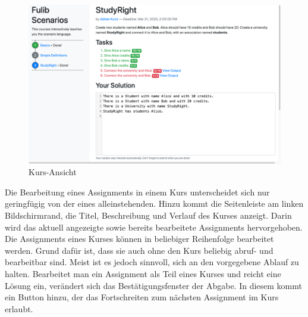 \begin{figure}
    \centering
    \includegraphics[width=\textwidth]{chapter/fulib.org/img/course-view.png}
    \caption{Kurs-Ansicht}
    \label{fig:course-view}
\end{figure}

Die Bearbeitung eines Assignments in einem Kurs unterscheidet sich nur geringfügig von der eines alleinstehenden.
Hinzu kommt die Seitenleiste am linken Bildschirmrand, die Titel, Beschreibung und Verlauf des Kurses anzeigt.
Darin wird das aktuell angezeigte sowie bereits bearbeitete Assignments hervorgehoben.
Die Assignments eines Kurses können in beliebiger Reihenfolge bearbeitet werden.
Grund dafür ist, dass sie auch ohne den Kurs beliebig abruf- und bearbeitbar sind.
Meist ist es jedoch sinnvoll, sich an den vorgegebene Ablauf zu halten.
Bearbeitet man ein Assignment als Teil eines Kurses und reicht eine Lösung ein, verändert sich das Bestätigungsfenster der Abgabe.
In diesem kommt ein Button hinzu, der das Fortschreiten zum nächsten Assignment im Kurs erlaubt.
